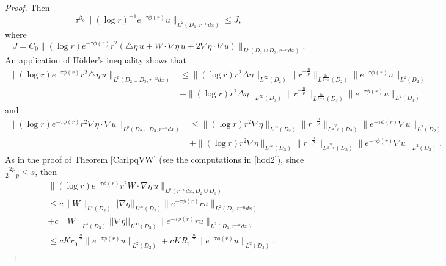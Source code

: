 \documentclass[11pt]{amsart}
\theoremstyle{plain}
\numberwithin{equation}{section}
\begin{document}
\begin{proof}
Then
\begin{equation}
\tau^{\beta_0} \|(\log r)^{-1} e^{-\tau \phi(r)} u\|_{L^2(D_1, r^{-n}dx )}\leq J,
\label{jjj}
\end{equation}
where
$$ J= C_0 \|(\log r) e^{-\tau \phi(r)} r^2 (\triangle \eta \, u+W\cdot \nabla \eta \, u + 2\nabla \eta \cdot \nabla u)\|_{L^p(D_2\cup D_3, r^{-n} dx)}.$$
An application of H\"older's inequality shows that
\begin{align*}
\|(\log r) e^{-\tau \phi(r)} r^2 \triangle \eta \, u\|_{L^p(D_2\cup D_3, r^{-n} dx)}
&\le \| {\left( {\log r} \right) } r^{2} {\Delta} \eta\|_{L^{\infty}{\left( {D_2} \right) }} \| r^{- \frac n p}\|_{L^{\frac{2p}{2-p}}{\left( {D_2} \right) }}\| e^{-\tau \phi(r)} u\|_{L^2(D_2)} \\
&+\| {\left( {\log r} \right) } r^{2} {\Delta} \eta\|_{L^{\infty}{\left( {D_3} \right) }} \| r^{- \frac n p}\|_{L^{\frac{2p}{2-p}}{\left( {D_3} \right) }}\| e^{-\tau \phi(r)} u\|_{L^2(D_3)}
\end{align*}
and
\begin{align*}
\|(\log r) e^{-\tau \phi(r)} r^2 {\nabla} \eta \cdot {\nabla} u\|_{L^p(D_2\cup D_3, r^{-n} dx)}
&\le \| {\left( {\log r} \right) } r^{2} {\nabla} \eta\|_{L^{\infty}{\left( {D_2} \right) }} \| r^{- \frac n p}\|_{L^{\frac{2p}{2-p}}{\left( {D_2} \right) }}\| e^{-\tau \phi(r)} {\nabla} u\|_{L^2(D_2)} \\
&+\| {\left( {\log r} \right) } r^{2} {\nabla} \eta\|_{L^{\infty}{\left( {D_3} \right) }} \| r^{- \frac n p}\|_{L^{\frac{2p}{2-p}}{\left( {D_3} \right) }}\| e^{-\tau \phi(r)} {\nabla} u\|_{L^2(D_3)}.
\end{align*}
As in the proof of Theorem \ref{CarlpqVW} (see the computations in \eqref{hod2}), since $\frac{2p}{2-p} \le s$, then
\begin{align*}
&\|(\log r) e^{-\tau\phi(r)} r^2 W\cdot\nabla \eta \, u\|_{L^p(r^{-n} dx, D_2 \cup D_3)} \\
&\le c \|W\|_{L^{s}{\left( {D_2} \right) }} {\left\vert\left\vert {{\nabla} \eta}\right\vert\right\vert}_{L^{\infty}{\left( {D_2} \right) }}\| e^{-\tau \phi(r)} r u \|_{L^2(D_2, r^{-n} dx)} \\
&+ c \|W\|_{L^{s}{\left( {D_3} \right) }} {\left\vert\left\vert {{\nabla} \eta}\right\vert\right\vert}_{L^{\infty}{\left( {D_3} \right) }}\| e^{-\tau \phi(r)} r u \|_{L^2(D_3, r^{-n} dx)} \\
&\le cK r_0^{-\frac{n}{2}}\|e^{-\tau \phi(r)} u\|_{{L^2(D_2)}}
+ cK R_1^{-\frac{n}{2}}\|e^{-\tau \phi(r)} u \|_{L^2(D_3)},
\end{align*}

\end{proof}
\end{document}

